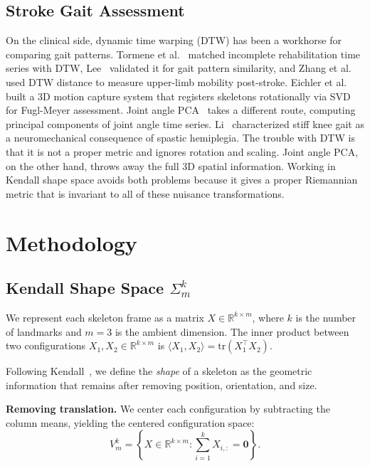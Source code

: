 \documentclass{article}
\begin{document}
\subsection{Stroke Gait Assessment}
On the clinical side, dynamic time warping (DTW) has been a workhorse for comparing gait patterns. Tormene et al.~\cite{tormene2009matching} matched incomplete rehabilitation time series with DTW, Lee~\cite{lee2019application} validated it for gait pattern similarity, and Zhang et al.~\cite{Zhang2016Objective} used DTW distance to measure upper-limb mobility post-stroke. Eichler et al.~\cite{eichler20183d} built a 3D motion capture system that registers skeletons rotationally via SVD for Fugl-Meyer assessment. Joint angle PCA~\cite{cho2024stroke} takes a different route, computing principal components of joint angle time series. Li~\cite{li2023stiff} characterized stiff knee gait as a neuromechanical consequence of spastic hemiplegia. The trouble with DTW is that it is not a proper metric and ignores rotation and scaling. Joint angle PCA, on the other hand, throws away the full 3D spatial information. Working in Kendall shape space avoids both problems because it gives a proper Riemannian metric that is invariant to all of these nuisance transformations.

\section{Methodology}
\label{sec:methodology}

\subsection{Kendall Shape Space $\Sigma_m^k$}
\label{sec:kendall}

We represent each skeleton frame as a matrix $X \in \mathbb{R}^{k \times m}$, where $k$ is the number of landmarks and $m = 3$ is the ambient dimension. The inner product between two configurations $X_1, X_2 \in \mathbb{R}^{k \times m}$ is $\langle X_1, X_2 \rangle = \mathrm{tr}(X_1^\top X_2)$.

Following Kendall~\cite{kendall2009shape}, we define the \emph{shape} of a skeleton as the geometric information that remains after removing position, orientation, and size.

\textbf{Removing translation.} We center each configuration by subtracting the column means, yielding the centered configuration space:
\begin{equation}
V_m^k = \left\{ X \in \mathbb{R}^{k \times m} : \sum_{i=1}^{k} X_{i,:} = \mathbf{0} \right\}.
\end{equation}
\end{document}
